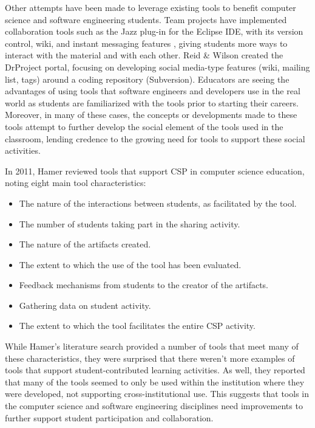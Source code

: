 Other attempts have been made to leverage existing tools to benefit computer science and software engineering students. Team projects have implemented collaboration tools such as the Jazz plug-in for the Eclipse IDE, with its version control, wiki, and instant messaging features \cite{meneely2009preparing}, giving students more ways to interact with the material and with each other. Reid \& Wilson \cite{reid2007drproject}  created the DrProject portal, focusing on developing social media-type features (wiki, mailing list, tags) around a coding repository (Subversion). Educators are seeing the advantages of using tools that software engineers and developers use in the real world as students are familiarized with the tools prior to starting their careers. Moreover, in many of these cases, the concepts or developments made to these tools attempt to further develop the social element of the tools used in the classroom, lending credence to the growing need for tools to support these social activities.

In 2011, Hamer \cite{hamer2011tools} reviewed tools that support CSP in computer science education, noting eight main tool characteristics:
\begin{itemize}
\item The nature of the interactions between students, as facilitated by the tool.
\item The number of students taking part in the sharing activity.
\item The nature of the artifacts created.
\item The extent to which the use of the tool has been evaluated.
\item Feedback mechanisms from students to the creator of the artifacts.
\item Gathering data on student activity.
\item The extent to which the tool facilitates the entire CSP activity.
\end{itemize}

While Hamer's literature search provided a number of tools that meet many of these characteristics, they were surprised that there weren't more examples of tools that support student-contributed learning activities. As well, they reported that many of the tools seemed to only be used within the institution where they were developed, not supporting cross-institutional use. This suggests that tools in the computer science and software engineering disciplines need improvements to further support student participation and collaboration.

